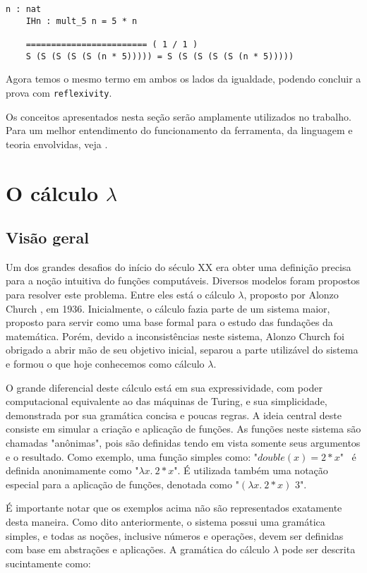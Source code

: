 \begin{lstlisting}[basicstyle=\small]
    n : nat
    IHn : mult_5 n = 5 * n

    ======================== ( 1 / 1 )
    S (S (S (S (S (n * 5))))) = S (S (S (S (S (n * 5)))))
\end{lstlisting}

Agora temos o mesmo termo em ambos os lados da igualdade, podendo concluir a
prova com \texttt{reflexivity}.

Os conceitos apresentados nesta seção serão amplamente utilizados no trabalho.
Para um melhor entendimento do funcionamento da ferramenta, da linguagem e
teoria envolvidas, veja \cite{pierce}.


\section{O cálculo $\lambda$}

\subsection{Visão geral}

Um dos grandes desafios do início do século XX era obter uma definição 
precisa para a noção intuitiva do funções computáveis. Diversos modelos foram
propostos para resolver este problema. Entre eles está o cálculo $\lambda$,
proposto por Alonzo Church \cite{lambda_first}, em 1936. Inicialmente, o cálculo
fazia parte de um sistema maior, proposto para servir como uma base
formal para o estudo das fundações da matemática. Porém, devido a
inconsistências neste sistema, Alonzo Church foi obrigado a abrir mão de seu
objetivo inicial, separou a parte utilizável do sistema e formou o que hoje
conhecemos como cálculo $\lambda$.

O grande diferencial deste cálculo está em sua expressividade, com poder
computacional equivalente ao das máquinas de Turing, e sua simplicidade,
demonstrada por sua gramática concisa e poucas regras. A ideia central deste
consiste em simular a criação e aplicação de funções. As funções neste sistema
são chamadas "anônimas", pois são definidas tendo em vista somente seus
argumentos e o resultado. Como exemplo, uma função simples como: "$double(x) =
2*x$" \ é definida anonimamente como "$\lambda x.\ 2*x$". É utilizada também uma
notação especial para a aplicação de funções, denotada como "$ (\lambda x.\
2*x)$  $3$".

É importante notar que os exemplos acima não são representados exatamente desta
maneira. Como dito anteriormente, o sistema possui uma gramática simples, e
todas as noções, inclusive números e operações, devem ser definidas com base em
abstrações e aplicações. A gramática do cálculo $\lambda$ pode ser descrita
sucintamente como:

